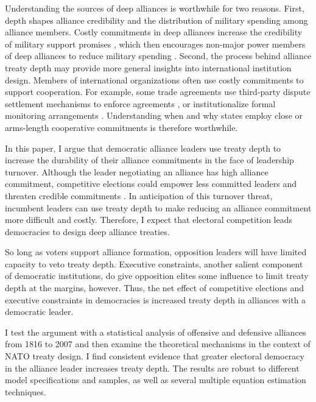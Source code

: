 \documentclass[12pt]{article}
\begin{document}
Understanding the sources of deep alliances is worthwhile for two reasons.
First, depth shapes alliance credibility and the distribution of military spending among alliance members. 
Costly commitments in deep alliances increase the credibility of military support promises \citep{Morrow1994}, which then encourages non-major power members of deep alliances to reduce military spending \citep{Alley2020}.  
Second, the process behind alliance treaty depth may provide more general insights into international institution design. 
Members of international organizations often use costly commitments to support cooperation. 
For example, some trade agreements use third-party dispute settlement mechanisms to enforce agreements \citep{Smith2000}, or institutionalize formal monitoring arrangements \citep{Duretal2013}.  
Understanding when and why states employ close or arms-length cooperative commitments is therefore worthwhile. 


In this paper, I argue that democratic alliance leaders use treaty depth to increase the durability of their alliance commitments in the face of leadership turnover. 
Although the leader negotiating an alliance has high alliance commitment, competitive elections could empower less committed leaders and threaten credible commitments \citep{GartzkeGleditsch2004, LeedsSavun2007}.
In anticipation of this turnover threat, incumbent leaders can use treaty depth to make reducing an alliance commitment more difficult and costly. 
Therefore, I expect that electoral competition leads democracies to design deep alliance treaties. 


So long as voters support alliance formation, opposition leaders will have limited capacity to veto treaty depth. 
Executive constraints, another salient component of democratic institutions, do give opposition elites some influence to limit treaty depth at the margins, however.
Thus, the net effect of competitive elections and executive constraints in democracies is increased treaty depth in alliances with a democratic leader.  


I test the argument with a statistical analysis of offensive and defensive alliances from 1816 to 2007 and then examine the theoretical mechanisms in the context of NATO treaty design.
I find consistent evidence that greater electoral democracy in the alliance leader increases treaty depth. 
The results are robust to different model specifications and samples, as well as several multiple equation estimation techniques. 
\end{document}

